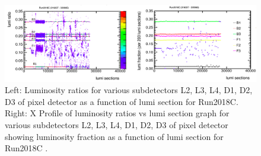 \begin{figure}[H]
  \centering
  \includegraphics[width=1\columnwidth]{./tfkx3-uyzgt.png}
  \caption{Left: Luminosity ratios for various subdetectors L2, L3, L4, D1, D2, D3 of pixel detector as a function of lumi section for Run2018C. Right: X Profile of luminosity ratios vs lumi section graph for various subdetectors L2, L3, L4, D1, D2, D3 of pixel detector showing luminosity fraction as a function of lumi section for Run2018C \cite{lumidpg}.}
  \label{fig:CMS}
\end{figure}




\clearpage\newpage
